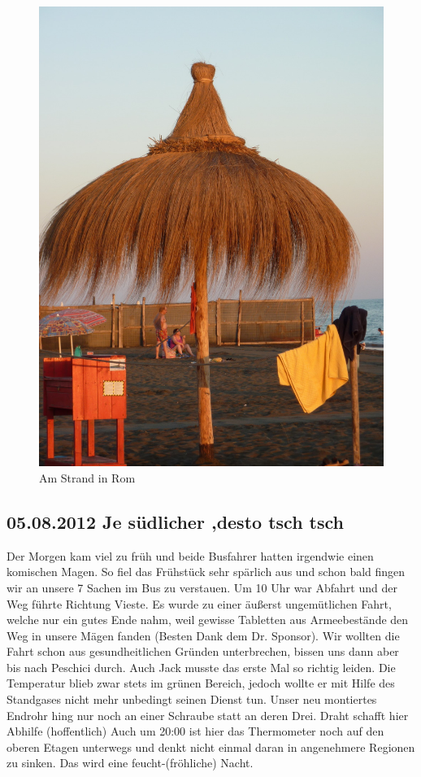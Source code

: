 \begin{figure}[hbp]
    \centering
    \includegraphics[width=\textwidth]{../Bilder/Sommer2012/4.jpg}
    \caption{Am Strand in Rom}
    \label{img:Sommer2}
\end{figure}

\subsection{05.08.2012 Je südlicher ,desto tsch tsch}
Der Morgen kam viel zu früh und beide Busfahrer hatten irgendwie einen komischen Magen.
So fiel das Frühstück sehr spärlich aus und schon bald fingen wir an unsere 7 Sachen im Bus zu verstauen.
Um 10 Uhr war Abfahrt und der Weg führte Richtung Vieste.
Es wurde zu einer äußerst ungemütlichen Fahrt, welche nur ein gutes Ende nahm, weil gewisse Tabletten aus Armeebestände den Weg in unsere Mägen fanden (Besten Dank dem Dr.  Sponsor).
Wir wollten die Fahrt schon aus gesundheitlichen Gründen unterbrechen, bissen uns dann aber bis nach Peschici durch.
Auch Jack musste das erste Mal so richtig leiden.
Die Temperatur blieb zwar stets im grünen Bereich, jedoch wollte er mit Hilfe des Standgases nicht mehr unbedingt seinen Dienst tun.
Unser neu montiertes Endrohr hing nur noch an einer Schraube statt an deren Drei.
Draht schafft hier Abhilfe (hoffentlich) Auch um 20:00 ist hier das Thermometer noch auf den oberen Etagen unterwegs und denkt nicht einmal daran in angenehmere Regionen zu sinken.
Das wird eine feucht-(fröhliche) Nacht.

